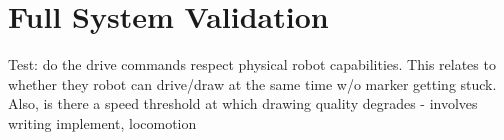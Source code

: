 
\section{Full System Validation}
\label{sec:system_validation}



Test: do the drive commands respect physical robot capabilities. This relates to whether they robot can drive/draw at the same time w/o marker getting stuck. Also, is there a speed threshold at which drawing quality degrades - involves writing implement, locomotion